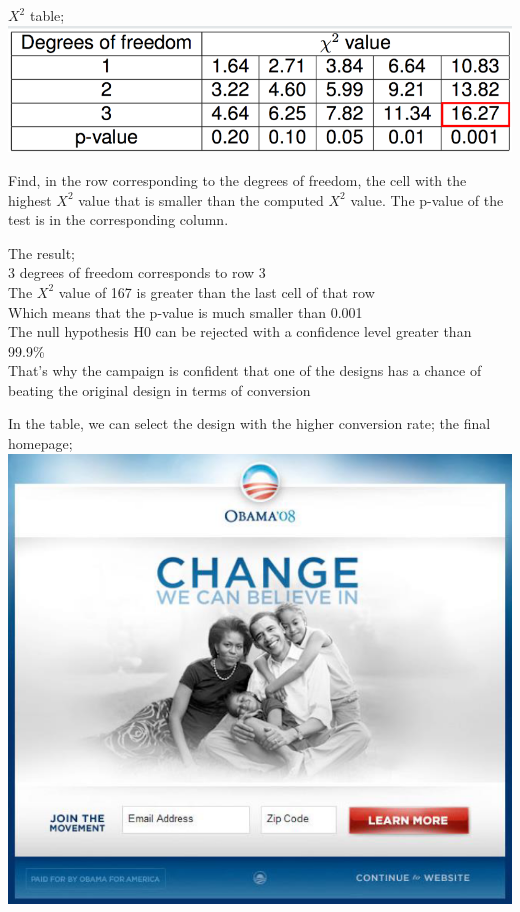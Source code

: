 \documentclass[]{project_plan}
\begin{document}
\newpage

$X^2$ table;\\
\includegraphics[width=\linewidth]{x2_table.png}

Find, in the row corresponding to the degrees of
freedom, the cell with the highest $X^2$ value that is smaller
than the computed $X^2$ value. The p-value of the test is in
the corresponding column.

The result;\\
3 degrees of freedom corresponds to row 3\\
The $X^2$ value of 167 is greater than the last cell of that row\\
Which means that the p-value is much smaller than 0.001\\
The null hypothesis H0 can be rejected with a confidence level greater than 99.9\%\\
That's why the campaign is confident that one of the designs
has a chance of beating the original design in terms of
conversion

In the table, we can select the design with the higher
conversion rate; the final homepage;\\
\includegraphics[width=\linewidth]{case_study_final_homepage.png}
\end{document}
